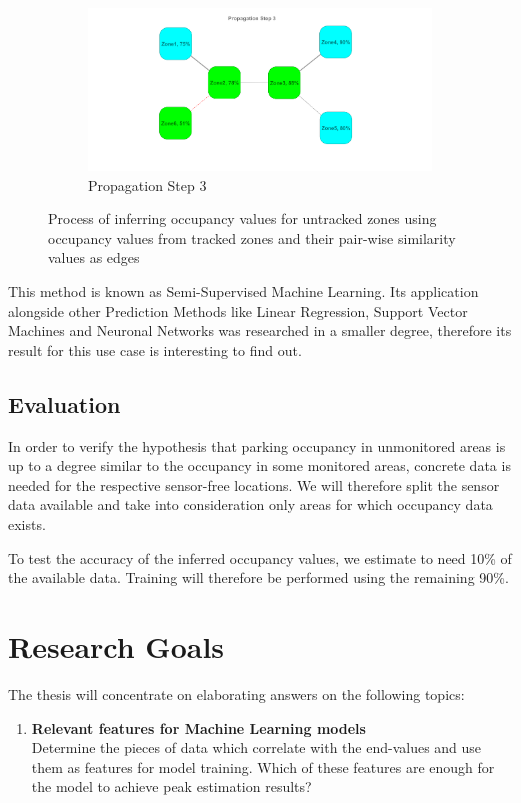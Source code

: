 \documentclass{article}
\begin{document}
\begin{large}
\begin{enumerate}
\begin{figure}
\begin{subfigure}[b]{.5\linewidth}
\includegraphics[width=\linewidth]{semi_supervised_graph_scene4.png}
\caption{Propagation Step 3}
\end{subfigure}

\caption{Process of inferring occupancy values for untracked zones using occupancy values from tracked zones and their pair-wise similarity values as edges}
\label{fig:semi_supervised}
\end{figure}

This method is known as Semi-Supervised Machine Learning. Its application alongside other Prediction Methods like Linear Regression, Support Vector Machines and Neuronal Networks was researched in a smaller degree, therefore its result for this use case is interesting to find out.
\end{enumerate}

\subsection{Evaluation} 
In order to verify the hypothesis that parking occupancy in unmonitored areas is up to a degree similar to the occupancy in some monitored areas, concrete data is needed for the respective sensor-free locations. We will therefore split the sensor data available and take into consideration only areas for which occupancy data exists.

To test the accuracy of the inferred occupancy va\-lues, we estimate to need 10\% of the available data. Training will therefore be performed using the remaining 90\%.

\section{Research Goals}

The thesis will concentrate on elaborating answers on the following topics:
\begin{enumerate}
\item \textbf{Relevant features for Machine Learning models}\\
Determine the pieces of data which correlate with the end-values and use them as features for model training. Which of these features are enough for the model to achieve peak estimation results?
\vspace{2mm}


\end{enumerate}
\end{large}
\end{document}
